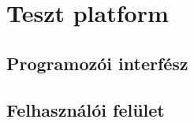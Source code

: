 \chapter{Teszt platform}\label{sect:Software}

\section{Programozói interfész}\label{sect:ProgInterface}



\section{Felhasználói felület}\label{sect:UserInterface}


